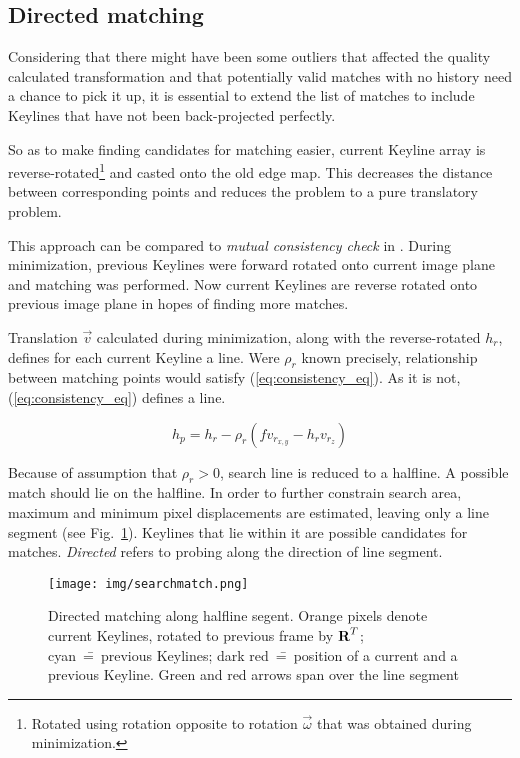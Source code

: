 \subsection{Directed matching}
\label{sec:directed}


Considering that there might have been some outliers that affected the quality calculated transformation and that potentially valid matches with no history need a chance to pick it up, it is essential to extend the list of matches to include Keylines that have not been back-projected perfectly.

So as to make finding candidates for matching easier, current Keyline array is reverse-rotated\footnote{Rotated using rotation opposite to rotation $\vec{\omega}$ that was obtained during minimization.} and casted onto the old edge map. This decreases the distance between corresponding points and reduces the problem to a pure translatory problem.

This approach can be compared to \textit{mutual consistency check} in \cite{a_stereo_visual}. During minimization, previous Keylines were forward rotated onto current image plane and matching was performed. Now current Keylines are reverse rotated onto previous image plane in hopes of finding more matches.

Translation $\vec{v}$ calculated during minimization, along with the reverse-rotated $h_r$, defines for each current Keyline a line. Were $\rho_r$ known precisely, relationship between matching points would satisfy (\ref{eq:consistency_eq}). As it is not, (\ref{eq:consistency_eq}) defines a line.

\begin{equation}
h_p = h_r - \rho_{r} \left( fv_{r_{x,y}}-h_{r}v_{r_z} \right)
\label{eq:consistency_eq}
\end{equation}

Because of assumption that $\rho_r > 0$, search line is reduced to a halfline. A possible match should lie on the halfline. In order to further constrain search area, maximum and minimum pixel displacements are estimated, leaving only a line segment (see Fig.~\ref{fig:directed_m}). Keylines that lie within it are possible candidates for matches. \textit{Directed} refers to probing along the direction of line segment.

\begin{figure}[ht]
	\centering\texttt{[image: img/searchmatch.png]}
	\caption{ Directed matching along halfline segent. Orange pixels denote current Keylines, rotated to previous frame by $\textbf{R}^T$; cyan~\==~previous Keylines; dark red~\==~position of a current and a previous Keyline. Green and red arrows span over the line segment }
	\label{fig:directed_m}
\end{figure}

